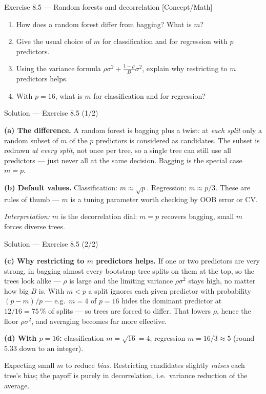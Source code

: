 \documentclass[aspectratio=169,11pt]{beamer}
\begin{document}
\begin{frame}{Exercise 8.5 --- Random forests and decorrelation [Concept/Math]}
\begin{exercise}
\begin{enumerate}
  \item How does a random forest differ from bagging? What is $m$?
  \item Give the usual choice of $m$ for classification and for regression with $p$ predictors.
  \item Using the variance formula $\rho\sigma^2+\frac{1-\rho}{B}\sigma^2$, explain why restricting to $m$ predictors helps.
  \item With $p=16$, what is $m$ for classification and for regression?
\end{enumerate}
\end{exercise}
\end{frame}

\begin{frame}{Solution --- Exercise 8.5 (1/2)}
\begin{solutionbox}
\textbf{(a) The difference.} A random forest is bagging plus a twist: at \emph{each split} only a random subset of $m$ of the $p$ predictors is considered as candidates. The subset is redrawn \emph{at every split}, not once per tree, so a single tree can still use all predictors --- just never all at the same decision. Bagging is the special case $m=p$.

\medskip
\textbf{(b) Default values.} Classification: $m\approx\sqrt{p}$. Regression: $m\approx p/3$. These are rules of thumb --- $m$ is a tuning parameter worth checking by OOB error or CV.

\medskip
\emph{Interpretation:} $m$ is the decorrelation dial: $m=p$ recovers bagging, small $m$ forces diverse trees.
\end{solutionbox}
\end{frame}

\begin{frame}{Solution --- Exercise 8.5 (2/2)}
\begin{solutionbox}
\textbf{(c) Why restricting to $m$ predictors helps.} If one or two predictors are very strong, in bagging almost every bootstrap tree splits on them at the top, so the trees look alike --- $\rho$ is large and the limiting variance $\rho\sigma^2$ stays high, no matter how big $B$ is. With $m<p$ a split ignores each given predictor with probability $(p-m)/p$ --- e.g.\ $m=4$ of $p=16$ hides the dominant predictor at $12/16=75\,\%$ of splits --- so trees are forced to differ. That lowers $\rho$, hence the floor $\rho\sigma^2$, and averaging becomes far more effective.

\medskip
\textbf{(d) With $p=16$:} classification $m=\sqrt{16}=4$; regression $m=16/3\approx 5$ (round $5.33$ down to an integer).
\end{solutionbox}
\begin{mistake}
Expecting small $m$ to reduce \emph{bias}. Restricting candidates slightly \emph{raises} each tree's bias; the payoff is purely in decorrelation, i.e.\ variance reduction of the average.
\end{mistake}
\end{frame}
\end{document}
